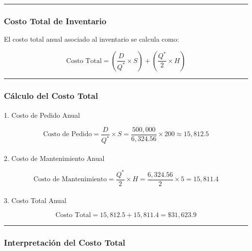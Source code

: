 \documentclass[
  letterpaper,
  DIV=11,
  numbers=noendperiod]{scrartcl}
\makeatletter
\let\oldparagraph\paragraph
\renewcommand{\paragraph}{
    \@ifstar
      \xxxParagraphStar
      \xxxParagraphNoStar
  }
\newcommand{\xxxParagraphStar}[1]{\oldparagraph*{#1}\mbox{}}
\newcommand{\xxxParagraphNoStar}[1]{\oldparagraph{#1}\mbox{}}
\makeatother
\begin{document}
\begin{center}\rule{0.5\linewidth}{0.5pt}\end{center}

\subsubsection{Costo Total de
Inventario}\label{costo-total-de-inventario}

El costo total anual asociado al inventario se calcula como:

\[
\text{Costo Total} = \left( \dfrac{D}{Q^*} \times S \right) + \left( \dfrac{Q^*}{2} \times H \right)
\]

\begin{center}\rule{0.5\linewidth}{0.5pt}\end{center}

\subsubsection{Cálculo del Costo
Total}\label{cuxe1lculo-del-costo-total-1}

\paragraph{1. Costo de Pedido Anual}\label{costo-de-pedido-anual}

\[
\text{Costo de Pedido} = \dfrac{D}{Q^*} \times S = \dfrac{500,000}{6,324.56} \times 200 \approx 15,812.5
\]

\paragraph{2. Costo de Mantenimiento
Anual}\label{costo-de-mantenimiento-anual}

\[
\text{Costo de Mantenimiento} = \dfrac{Q^*}{2} \times H = \dfrac{6,324.56}{2} \times 5 = 15,811.4
\]

\paragraph{3. Costo Total Anual}\label{costo-total-anual}

\[
\text{Costo Total} = 15,812.5 + 15,811.4 = \$31,623.9
\]

\begin{center}\rule{0.5\linewidth}{0.5pt}\end{center}

\subsubsection{Interpretación del Costo
Total}\label{interpretaciuxf3n-del-costo-total}
\end{document}
